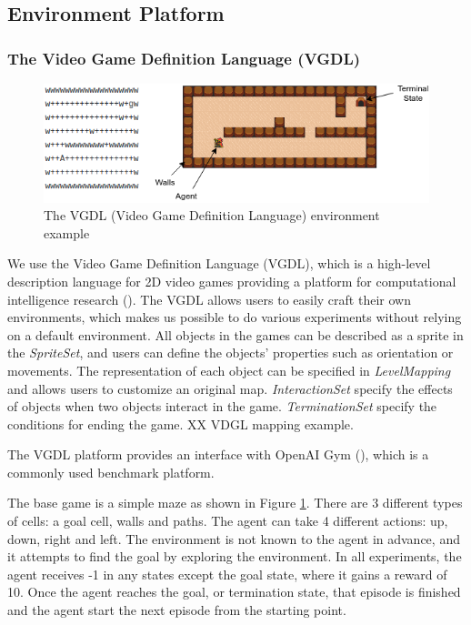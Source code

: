 \subsection{Environment Platform}
\subsubsection{The Video Game Definition Language (VGDL)}

\begin{figure}[!ht!b]
\centering
\includegraphics[width=1\textwidth]{./figures/env_sample}
\caption{The VGDL (Video Game Definition Language) environment example} 
\label{VGDL_sample}
\end{figure}

We use the Video Game Definition Language (VGDL), which is a high-level description language for 2D video games providing a platform for computational intelligence research (\cite{Schaul2013}).
The VGDL allows users to easily craft their own environments, which makes us possible to do various experiments without relying on a default environment. 
All objects in the games can be described as a sprite in the \textit{SpriteSet}, and users can define the objects' properties such as orientation or movements.
The representation of each object can be specified in \textit{LevelMapping} and allows users to customize an original map.
\textit{InteractionSet} specify the effects of objects when two objects interact in the game.
\textit{TerminationSet} specify the conditions for ending the game.
XX VDGL mapping example.

The VGDL platform provides an interface with OpenAI Gym (\cite{Brockman2016}), which is a commonly used benchmark platform.

The base game is a simple maze as shown in Figure \ref{VGDL_sample}.
There are 3 different types of cells: a goal cell, walls and paths. The agent can take 4 different actions: up, down, right and left.
The environment is not known to the agent in advance, and it attempts to find the goal by exploring the environment.
In all experiments, the agent receives -1 in any states except the goal state, where it gains a reward of 10.
Once the agent reaches the goal, or termination state, that episode is finished and the agent start the next episode from the starting point.

